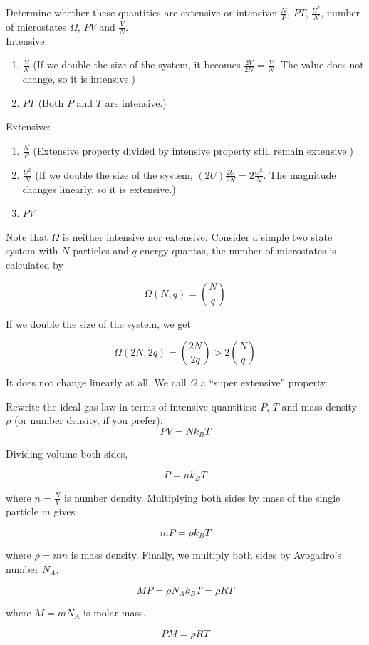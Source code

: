 \documentclass[12pt, a4paper]{article}
\newcounter{exa}
\begin{document}
\begin{texample}
Determine whether these quantities are extensive or intensive: $\frac{N}{P}$, $PT$, $\frac{U^2}{N}$, number of microstates $\Omega$, $PV$ and $\frac{V}{N}$. \\

Intensive:
\begin{enumerate}
\item $\frac{V}{N}$ (If we double the size of the system, it becomes $\frac{2V}{2N}=\frac{V}{N}$. The value does not change, so it is intensive.)
\item $PT$ (Both $P$ and $T$ are intensive.)
\end{enumerate}

Extensive:
\begin{enumerate}
\item $\frac{N}{P}$ (Extensive property divided by intensive property still remain extensive.)
\item $\frac{U^2}{N}$ (If we double the size of the system, $(2U)\frac{2U}{2N}=2\frac{U^2}{N}$. The magnitude changes linearly, so it is extensive.)
\item $PV$
\end{enumerate}

Note that $\Omega$ is neither intensive nor extensive. Consider a simple two state system with $N$ particles and $q$ energy quantas, the number of microstates is calculated by

\[\Omega(N,q)={N \choose q}\]

If we double the size of the system, we get

\[\Omega(2N,2q)={2N \choose 2q}>2{N \choose q}\]

It does not change linearly at all. We call $\Omega$ a ``super extensive'' property.
\end{texample}

\begin{texample}
Rewrite the ideal gas law in terms of intensive quantities: $P$, $T$ and mass density $\rho$ (or number density, if you prefer). \\

\[PV=Nk_BT\]

Dividing volume both sides,

\[P=nk_BT\]

where $n=\frac{N}{V}$ is number density. Multiplying both sides by mass of the single particle $m$ gives

\[mP=\rho k_BT\]

where $\rho=mn$ is mass density. Finally, we multiply both sides by Avogadro's number $N_A$,

\[MP=\rho N_A k_B T=\rho RT\]

where $M=mN_A$ is molar mass.

\[\boxed{PM=\rho RT}\]
\end{texample}
\end{document}
